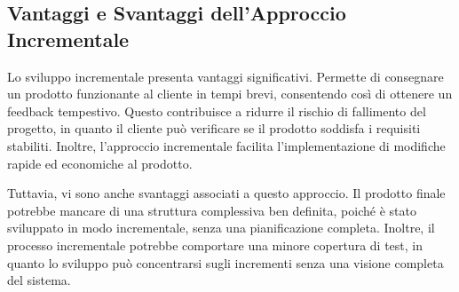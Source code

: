 \subsection{Vantaggi e Svantaggi dell'Approccio Incrementale}

Lo sviluppo incrementale presenta vantaggi significativi. Permette
di consegnare un prodotto funzionante al cliente in tempi brevi, consentendo
così di ottenere un feedback tempestivo. Questo contribuisce a ridurre il rischio 
di fallimento del progetto, in quanto il cliente può verificare se il prodotto soddisfa
i requisiti stabiliti. Inoltre, l'approccio incrementale facilita l'implementazione di
modifiche rapide ed economiche al prodotto.

Tuttavia, vi sono anche svantaggi associati a questo approccio. Il prodotto finale
potrebbe mancare di una struttura complessiva ben definita, poiché è stato sviluppato
in modo incrementale, senza una pianificazione completa. Inoltre, il processo
incrementale potrebbe comportare una minore copertura di test, in quanto lo sviluppo
può concentrarsi sugli incrementi senza una visione completa del sistema.
